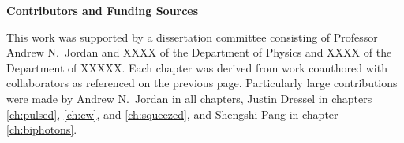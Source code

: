 \clearpage
\thispagestyle{empty}
\begin{center}
  \textbf{Contributors and Funding Sources}
\end{center}

This work was supported by a dissertation committee consisting of Professor Andrew N.~Jordan and XXXX of the Department of Physics and XXXX of the Department of XXXXX.  Each chapter was derived from work coauthored with collaborators as referenced on the previous page.  Particularly large contributions were made by Andrew N.~Jordan in all chapters, Justin Dressel in chapters \ref{ch:pulsed}, \ref{ch:cw}, and \ref{ch:squeezed}, and Shengshi Pang in chapter \ref{ch:biphotons}.

